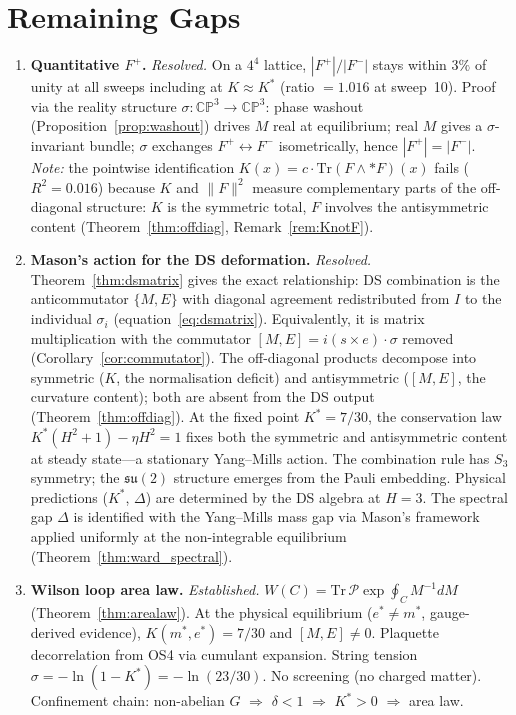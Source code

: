 \documentclass[11pt,a4paper]{article}
\theoremstyle{definition}
\theoremstyle{remark}
\newcommand{\CP}{\mathbb{CP}}
\newcommand{\Tr}{\mathrm{Tr}}
\newcommand{\su}{\mathfrak{su}}
\begin{document}
\section{Remaining Gaps}\label{sec:gaps}

\begin{enumerate}[nosep]
\item \textbf{Quantitative $F^+$.} \emph{Resolved.} On a $4^4$ lattice, $|F^+|/|F^-|$ stays within $3\%$ of unity at all sweeps including at $K\approx K^*$ (ratio $=1.016$ at sweep~10). Proof via the reality structure $\sigma:\CP^3\to\CP^3$: phase washout (Proposition~\ref{prop:washout}) drives $M$ real at equilibrium; real $M$ gives a $\sigma$-invariant bundle; $\sigma$ exchanges $F^+\leftrightarrow F^-$ isometrically, hence $|F^+|=|F^-|$. \emph{Note:} the pointwise identification $K(x)=c\cdot\Tr(F\wedge{*}F)(x)$ fails ($R^2=0.016$) because $K$ and $\|F\|^2$ measure complementary parts of the off-diagonal structure: $K$ is the symmetric total, $F$ involves the antisymmetric content (Theorem~\ref{thm:offdiag}, Remark~\ref{rem:KnotF}).
\item \textbf{Mason's action for the DS deformation.} \emph{Resolved.} Theorem~\ref{thm:dsmatrix} gives the exact relationship: DS combination is the anticommutator $\{M,E\}$ with diagonal agreement redistributed from $I$ to the individual $\sigma_i$ (equation~\ref{eq:dsmatrix}). Equivalently, it is matrix multiplication with the commutator $[M,E]=i(s\times e)\cdot\sigma$ removed (Corollary~\ref{cor:commutator}). The off-diagonal products decompose into symmetric ($K$, the normalisation deficit) and antisymmetric ($[M,E]$, the curvature content); both are absent from the DS output (Theorem~\ref{thm:offdiag}). At the fixed point $K^*=7/30$, the conservation law $K^*(H^2+1)-\eta H^2=1$ fixes both the symmetric and antisymmetric content at steady state---a stationary Yang--Mills action. The combination rule has $S_3$ symmetry; the $\su(2)$ structure emerges from the Pauli embedding. Physical predictions ($K^*$, $\Delta$) are determined by the DS algebra at $H=3$. The spectral gap $\Delta$ is identified with the Yang--Mills mass gap via Mason's framework applied uniformly at the non-integrable equilibrium (Theorem~\ref{thm:ward_spectral}).
\item \textbf{Wilson loop area law.} \emph{Established.} $W(C)=\Tr\,\mathcal{P}\exp\!\oint_C M^{-1}dM$ (Theorem~\ref{thm:arealaw}). At the physical equilibrium ($e^*\neq m^*$, gauge-derived evidence), $K(m^*,e^*)=7/30$ and $[M,E]\neq 0$. Plaquette decorrelation from OS4 via cumulant expansion. String tension $\sigma=-\ln(1-K^*)=-\ln(23/30)$. No screening (no charged matter). Confinement chain: non-abelian $G$ $\Rightarrow$ $\delta<1$ $\Rightarrow$ $K^*>0$ $\Rightarrow$ area law.

\end{enumerate}
\end{document}
